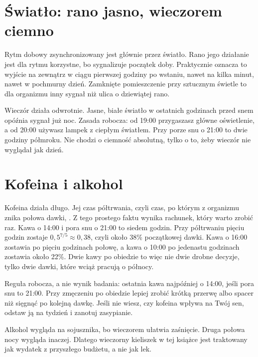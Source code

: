 \section{Światło: rano jasno, wieczorem ciemno}

Rytm dobowy zsynchronizowany jest głównie przez światło. Rano jego działanie jest dla rytmu korzystne, bo sygnalizuje początek doby. Praktycznie oznacza to wyjście na zewnątrz w ciągu pierwszej godziny po wstaniu, nawet na kilka minut, nawet w pochmurny dzień. Zamknięte pomieszczenie przy sztucznym świetle to dla organizmu inny sygnał niż ulica o dziewiątej rano. 

Wieczór działa odwrotnie. Jasne, białe światło w ostatnich godzinach przed snem opóźnia sygnał \glqq{}już noc\grqq{}. Zasada robocza: od 19:00 przygaszasz główne oświetlenie, a od 20:00 używasz lampek z ciepłym światłem. Przy porze snu o 21:00 to dwie godziny półmroku. Nie chodzi o ciemność absolutną, tylko o to, żeby wieczór nie wyglądał jak dzień.

\section{Kofeina i alkohol}

Kofeina działa długo. Jej czas półtrwania, czyli czas, po którym z organizmu znika połowa dawki, . Z tego prostego faktu wynika rachunek, który warto zrobić raz. Kawa o 14:00 i pora snu o 21:00 to siedem godzin. Przy półtrwaniu pięciu godzin zostaje $0{,}5^{7/5} \approx 0{,}38$, czyli około 38\% początkowej dawki. Kawa o 16:00 zostawia po pięciu godzinach połowę, a kawa o 10:00 po jedenastu godzinach zostawia około 22\%. Dwie kawy po obiedzie to więc nie dwie drobne decyzje, tylko dwie dawki, które wciąż pracują o północy.

Reguła robocza, a nie wynik badania: ostatnia kawa najpóźniej o 14:00, jeśli pora snu to 21:00. Przy zmęczeniu po obiedzie lepiej zrobić krótką przerwę albo spacer niż sięgnąć po kolejną dawkę. Jeśli nie wiesz, czy kofeina wpływa na Twój sen, odstaw ją na tydzień i zanotuj zasypianie.

Alkohol wygląda na sojusznika, bo wieczorem ułatwia zaśnięcie. Druga połowa nocy wygląda inaczej.  Dlatego wieczorny kieliszek w tej książce jest traktowany jak wydatek z przyszłego budżetu, a nie jak lek.

